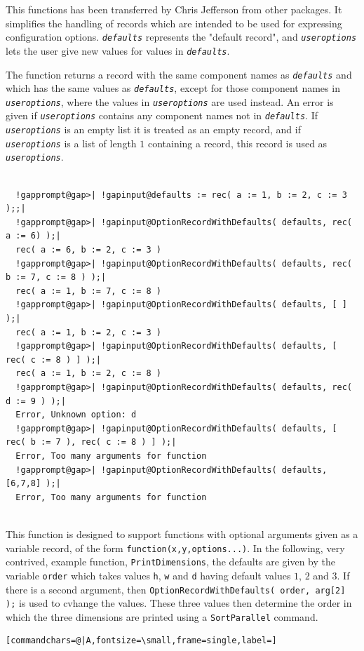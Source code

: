 \documentclass[a4paper,11pt]{report}
\begin{document}
{{{ This functions has been transferred by Chris Jefferson from other packages. It
simplifies the handling of records which are intended to be used for
expressing configuration options. \mbox{\texttt{\mdseries\slshape defaults}} represents the "default record", and \mbox{\texttt{\mdseries\slshape useroptions}} lets the user give new values for values in \mbox{\texttt{\mdseries\slshape defaults}}. 

 The function returns a record with the same component names as \mbox{\texttt{\mdseries\slshape defaults}} and which has the same values as \mbox{\texttt{\mdseries\slshape defaults}}, except for those component names in \mbox{\texttt{\mdseries\slshape useroptions}}, where the values in \mbox{\texttt{\mdseries\slshape useroptions}} are used instead. An error is given if \mbox{\texttt{\mdseries\slshape useroptions}} contains any component names not in \mbox{\texttt{\mdseries\slshape defaults}}. If \mbox{\texttt{\mdseries\slshape useroptions}} is an empty list it is treated as an empty record, and if \mbox{\texttt{\mdseries\slshape useroptions}} is a list of length $1$ containing a record, this record is used as \mbox{\texttt{\mdseries\slshape useroptions}}. 

 }

 
\begin{Verbatim}[commandchars=!@|,fontsize=\small,frame=single,label=Example]
  
  !gapprompt@gap>| !gapinput@defaults := rec( a := 1, b := 2, c := 3 );;|
  !gapprompt@gap>| !gapinput@OptionRecordWithDefaults( defaults, rec( a := 6) );|
  rec( a := 6, b := 2, c := 3 )
  !gapprompt@gap>| !gapinput@OptionRecordWithDefaults( defaults, rec( b := 7, c := 8 ) );|
  rec( a := 1, b := 7, c := 8 )
  !gapprompt@gap>| !gapinput@OptionRecordWithDefaults( defaults, [ ] );|
  rec( a := 1, b := 2, c := 3 )
  !gapprompt@gap>| !gapinput@OptionRecordWithDefaults( defaults, [ rec( c := 8 ) ] );|
  rec( a := 1, b := 2, c := 8 )
  !gapprompt@gap>| !gapinput@OptionRecordWithDefaults( defaults, rec( d := 9 ) );|
  Error, Unknown option: d
  !gapprompt@gap>| !gapinput@OptionRecordWithDefaults( defaults, [ rec( b := 7 ), rec( c := 8 ) ] );|
  Error, Too many arguments for function
  !gapprompt@gap>| !gapinput@OptionRecordWithDefaults( defaults, [6,7,8] );|
  Error, Too many arguments for function
  
\end{Verbatim}
 This function is designed to support functions with optional arguments given
as a variable record, of the form \texttt{function(x,y,options...)}. In the following, very contrived, example function, \texttt{PrintDimensions}, the defaults are given by the variable \texttt{order} which takes values \texttt{h}, \texttt{w} and \texttt{d} having default values $1$, $2$ and $3$. If there is a second argument, then \texttt{OptionRecordWithDefaults( order, arg[2] );} is used to cvhange the values. These three values then determine the order in
which the three dimensions are printed using a \texttt{SortParallel} command. 
\begin{Verbatim}[commandchars=@|A,fontsize=\small,frame=single,label=]
  

\end{Verbatim}}}
\end{document}
